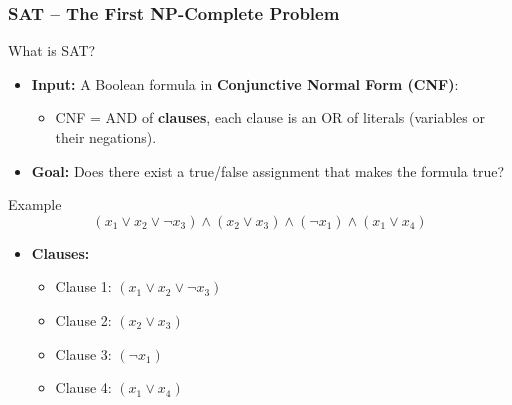 \documentclass[10pt,aspectratio=43]{beamer}
\begin{document}
\begin{frame}
    \frametitle{SAT – The First NP-Complete Problem}

    \begin{block}{What is SAT?}
        \begin{itemize}
            \item \textbf{Input:} A Boolean formula in \textbf{Conjunctive Normal Form (CNF)}:
            \begin{itemize}
                \item CNF = AND of \textbf{clauses}, each clause is an OR of literals (variables or their negations).
            \end{itemize}
            \item \textbf{Goal:} Does there exist a true/false assignment that makes the formula true?
        \end{itemize}
    \end{block}

    \vspace{0.5em}

    \begin{block}{Example}
        \[
        (x_1 \lor x_2 \lor \lnot x_3) \land (x_2 \lor x_3) \land (\lnot x_1) \land (x_1 \lor x_4)
        \]

        \begin{itemize}
            \item \textbf{Clauses:}
            \begin{itemize}
                \item Clause 1: $(x_1 \lor x_2 \lor \lnot x_3)$
                \item Clause 2: $(x_2 \lor x_3)$
                \item Clause 3: $(\lnot x_1)$
                \item Clause 4: $(x_1 \lor x_4)$
            \end{itemize}
        \end{itemize}
    \end{block}
\end{frame}

\end{document}

